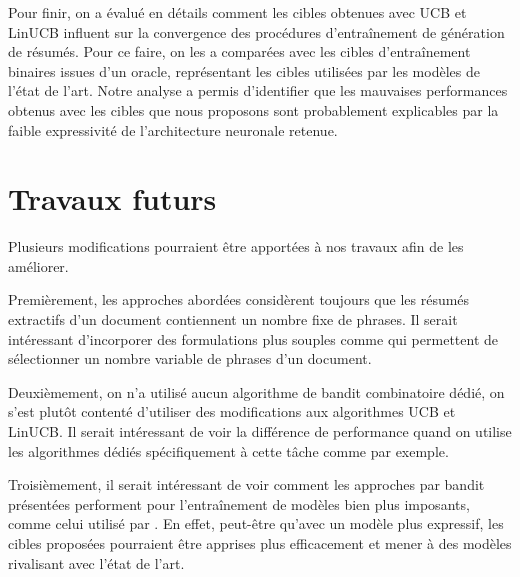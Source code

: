 Pour finir, on a évalué en détails comment les 
cibles obtenues avec UCB et LinUCB influent sur la convergence 
des procédures d'entraînement de génération de résumés.
Pour ce faire, on les a comparées avec les cibles d'entraînement 
binaires issues d'un oracle, représentant les cibles 
utilisées par les modèles de l'état de l'art.
Notre analyse a permis d'identifier que les mauvaises performances 
obtenus avec les cibles que nous proposons sont probablement explicables 
par la faible expressivité de l'architecture neuronale retenue.

\section*{Travaux futurs}

Plusieurs modifications pourraient être apportées à nos travaux afin 
de les améliorer.

Premièrement, les approches abordées considèrent toujours 
que les résumés extractifs d'un document contiennent un nombre 
fixe de phrases.
Il serait intéressant d'incorporer des formulations plus souples 
comme \citet{luo-etal-2019-reading} qui permettent de sélectionner 
un nombre variable de phrases d'un document.

Deuxièmement, on n'a utilisé aucun algorithme de bandit combinatoire dédié,
on s'est plutôt contenté d'utiliser des modifications aux algorithmes 
UCB et LinUCB.
Il serait intéressant de voir la différence de performance quand on utilise les algorithmes
dédiés spécifiquement à cette tâche comme \citet{10.5555/2969442.2969476} par exemple.

Troisièmement, il serait intéressant de voir comment les approches 
par bandit présentées performent pour l'entraînement de modèles 
bien plus imposants, comme celui utilisé par \citet{liu2019text}.
En effet, peut-être qu'avec un modèle plus expressif, les cibles 
proposées pourraient être apprises plus efficacement et mener à des 
modèles rivalisant avec l'état de l'art.
